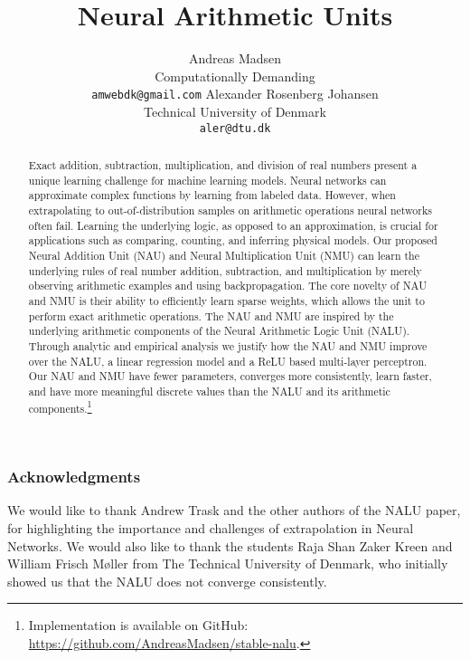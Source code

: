 \documentclass{article}
\title{Neural Arithmetic Units}
\author{%
  Andreas Madsen \\
  Computationally Demanding \\
  \texttt{amwebdk@gmail.com}
  \And
  Alexander Rosenberg Johansen \\
  Technical University of Denmark \\
  \texttt{aler@dtu.dk} \\
}
\begin{document}
\maketitle

\begin{abstract}
Exact addition, subtraction, multiplication, and division of real numbers present a unique learning challenge for machine learning models. Neural networks can approximate complex functions by learning from labeled data. However, when extrapolating to out-of-distribution samples on arithmetic operations neural networks often fail. Learning the underlying logic, as opposed to an approximation, is crucial for applications such as comparing, counting, and inferring physical models. Our proposed Neural Addition Unit (NAU) and Neural Multiplication Unit (NMU) can learn the underlying rules of real number addition, subtraction, and multiplication by merely observing arithmetic examples and using backpropagation. The core novelty of NAU and NMU is their ability to efficiently learn sparse weights, which allows the unit to perform exact arithmetic operations. The NAU and NMU are inspired by the underlying arithmetic components of the Neural Arithmetic Logic Unit (NALU). Through analytic and empirical analysis we justify how the NAU and NMU improve over the NALU, a linear regression model and a ReLU based multi-layer perceptron. Our NAU and NMU have fewer parameters, converges more consistently, learn faster, and have more meaningful discrete values than the NALU and its arithmetic components.\ifdefined\nonanonymous\footnote{Implementation is available on GitHub: \url{https://github.com/AndreasMadsen/stable-nalu}.}\fi
\end{abstract}







\clearpage
\ifdefined\nonanonymous
\subsubsection*{Acknowledgments}
We would like to thank Andrew Trask and the other authors of the NALU paper, for highlighting the importance and challenges of extrapolation in Neural Networks. We would also like to thank the students Raja Shan Zaker Kreen and William Frisch Møller from The Technical University of Denmark, who initially showed us that the NALU does not converge consistently.
\fi




\newpage
\appendix

\clearpage

\clearpage

\clearpage
\end{document}
